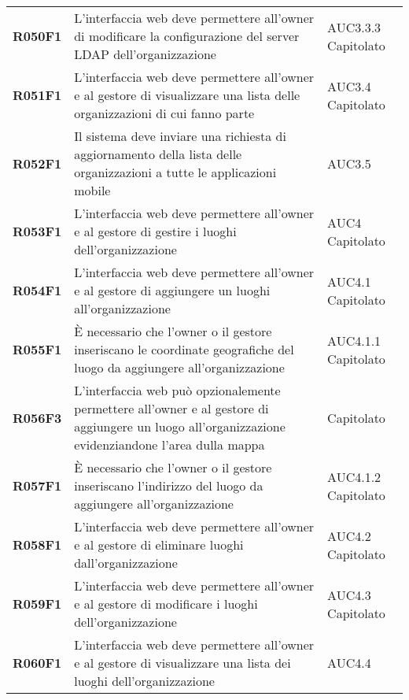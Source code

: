\documentclass[../analisi-dei-requisiti.tex]{subfiles}
\begin{document}
\begin{longtable}[H]{>{\centering\bfseries}m{3cm} >{\centering}m{10cm} >{\centering\arraybackslash}m{3cm}}
  R050F1                  & L'interfaccia web deve permettere all'owner di modificare la configurazione del server LDAP dell'organizzazione                                                                    & AUC3.3.3 Capitolato           \\
  R051F1                  & L'interfaccia web deve permettere all'owner e al gestore di visualizzare una lista delle organizzazioni di cui fanno parte                                                         & AUC3.4 Capitolato             \\
  R052F1                  & Il sistema deve inviare una richiesta di aggiornamento della lista delle organizzazioni a tutte le applicazioni mobile                                                             & AUC3.5                        \\

  R053F1                  & L'interfaccia web deve permettere all'owner e al gestore di gestire i luoghi dell'organizzazione                                                                                   & AUC4 Capitolato               \\
  R054F1                  & L'interfaccia web deve permettere all'owner e al gestore di aggiungere un luoghi all'organizzazione                                                                                & AUC4.1 Capitolato             \\
  R055F1                  & È necessario che l'owner o il gestore inseriscano le coordinate geografiche del luogo da aggiungere all'organizzazione                                                             & AUC4.1.1 Capitolato           \\
  R056F3                  & L'interfaccia web può opzionalemente permettere all'owner e al gestore di aggiungere un luogo all'organizzazione evidenziandone l'area dulla mappa                                 & Capitolato                    \\
  R057F1                  & È necessario che l'owner o il gestore inseriscano l'indirizzo del luogo da aggiungere all'organizzazione                                                                           & AUC4.1.2 Capitolato           \\
  R058F1                  & L'interfaccia web deve permettere all'owner e al gestore di eliminare luoghi dall'organizzazione                                                                                   & AUC4.2 Capitolato             \\
  R059F1                  & L'interfaccia web deve permettere all'owner e al gestore di modificare i luoghi dell'organizzazione                                                                                & AUC4.3 Capitolato             \\
  R060F1                  & L'interfaccia web deve permettere all'owner e al gestore di visualizzare una lista dei luoghi dell'organizzazione                                                                  & AUC4.4                        \\


\end{longtable}
\end{document}
